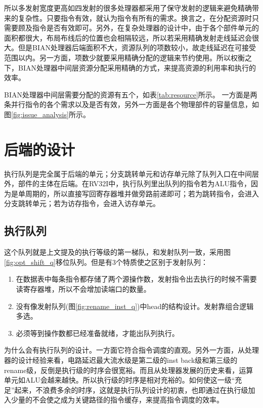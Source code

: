 所以多发射宽度更高如四发射的很多处理器都采用了保守发射的逻辑来避免精确带来的复杂性。只要指令有效，就认为指令有所有的需求。换言之，在分配资源时只需要顾及指令是否有效即可。另外，在复杂处理器的设计中，由于各个部件单元的面积都很大，布局布线后的位置也会相隔较远，所以若采用精确发射走线延迟会很大。但是BIAN处理器后端面积不大，资源队列的项数较小，故走线延迟在可接受范围以内。另一方面，项数少就要采用精确分配的逻辑来节约使用。所以权衡之下，BIAN处理器中间层资源分配采用精确的方式，来提高资源的利用率和执行的效率。


BIAN处理器中间层需要分配的资源有五个，如表\ref{tab:resource}所示。
一方面是两条并行指令的各个需求以及是否有效，另外一方面是各个物理部件的容量信息，如图\ref{fig:issue_analysis}所示。

\section{后端的设计}
执行队列是完全属于后端的单元；分支跳转单元和访存单元除了队列入口在中间层外，部件的主体在后端。在RV32I中，执行队列里出队列的指令若为ALU指令，因为是单周期的，所以直接写回寄存器堆并做旁路前递即可；若为跳转指令，会进入分支跳转单元；若为访存指令，会进入访存单元。

\subsection{执行队列}\label{subsec:execute_q}

这个队列就是上文提及的执行等级的第一梯队，和发射队列一致，采用图\ref{fig:opt_shift_q}移位队列。但是有3个特质使之区别于发射队列：
\begin{enumerate}[label=(\alph*)]
	\item 在数据表中每条指令都存储了两个源操作数，发射指令出去执行的时候不需要读寄存器堆，所以不会增加读端口的数量。
	\item 没有像发射队列(图\ref{fig:rename_inst_q})中head的结构设计。发射靠组合逻辑多选。
	\item 必须等到操作数都已经准备就绪，才能出队列执行。
\end{enumerate}

为什么会有执行队列的设计。一方面它符合指令调度的直观。另外一方面，从处理器的设计经验来看，电路延迟最大流水级是第二级的inst back级和第三级的rename级，反倒是执行级的时序会很宽裕。而且从处理器发展的历史来看，运算单元如ALU会越来越快。所以执行级的时序是相对充裕的。如何使这一级``充足''起来，不浪费多余的时序，这就是执行队列设计的初衷，也即通过在执行级加入少量的不会使之成为关键路径的指令缓存，来提高指令调度的效率。

